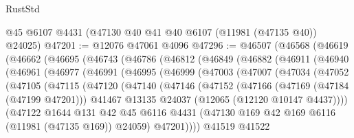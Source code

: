 \begin{lexlean}{RustStd}
\begin{coremodule}
    @45
    @6107
    @4431
    (@47130 @40 @41 @40 @6107 (@11981 (@47135 @40)) @24025)
@47201 := @12076 @47061 @4096
@47296 := @46507
    (@46568
      (@46619
        (@46662
          (@46695
            (@46743
              (@46786
                (@46812
                  (@46849
                    (@46882
                      (@46911
                        (@46940
                          (@46961
                            (@46977
                              (@46991
                                (@46995
                                  (@46999
                                    (@47003
                                      (@47007
                                        (@47034
                                          (@47052
                                            (@47105
                                              (@47115
                                                (@47120
                                                  (@47140
                                                    (@47146
                                                      (@47152
                                                        (@47166
                                                          (@47169 (@47184 (@47199 @47201)))
                                                          @41467
                                                          @13135
                                                          @24037
                                                          (@12065 (@12120 @10147 @4437))))
                                                      (@47122
                                                        @1644
                                                        @131
                                                        @42
                                                        @45
                                                        @6116
                                                        @4431
                                                        (@47130
                                                          @169
                                                          @42
                                                          @169
                                                          @6116
                                                          (@11981 (@47135 @169))
                                                          @24059)
                                                        @47201))))
                                                @41519
                                                @41522

\end{coremodule}
\end{lexlean}
